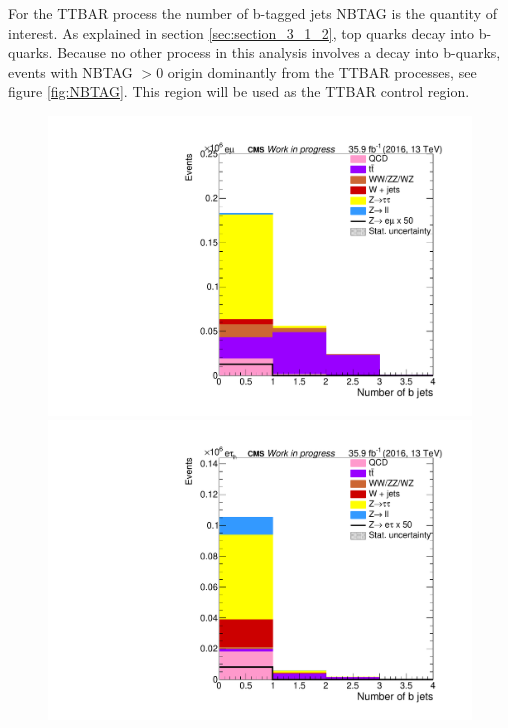 \newpage

For the \gls{TTBAR} process the number of b-tagged jets \gls{NBTAG} is the quantity of interest. As explained in section \ref{sec:section_3_1_2}, top quarks decay into b-quarks. Because no other process in this analysis involves a decay into b-quarks, events with \gls{NBTAG} $> 0$ origin dominantly from the \gls{TTBAR} processes, see figure \ref{fig:NBTAG}. This region will be used as the \gls{TTBAR} control region. \\

\begin{figure}[htp]
	\centering
		
	\begin{multicols}{2}
		\includegraphics[width=\linewidth]{plots/em/NumberOfBJets.pdf}
		\includegraphics[width=\linewidth]{plots/et/NumberOfBJets.pdf}
	\end{multicols}


\end{figure}

